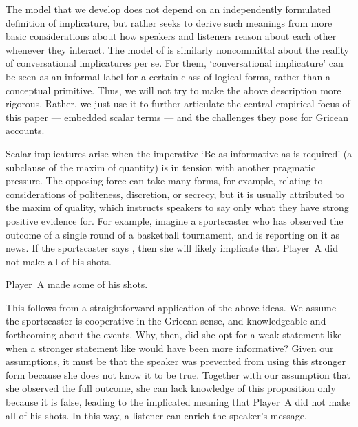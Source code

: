 \documentclass[leqno]{article}
\begin{document}
The model that we develop does not depend on an independently
formulated definition of implicature, but rather seeks to derive such
meanings from more basic considerations about how speakers and
listeners reason about each other whenever they interact. The model of
\citet{ChierchiaFoxSpector08} is similarly noncommittal about the
reality of conversational implicatures per se. For them,
`conversational implicature' can be seen as an informal label for a
certain class of logical forms, rather than a conceptual
primitive. Thus, we will not try to make the above description more
rigorous. Rather, we just use it to further articulate the central
empirical focus of this paper --- embedded scalar terms --- and the
challenges they pose for Gricean accounts.

Scalar implicatures arise when the imperative `Be as informative as is
required' (a subclause of the maxim of quantity) is in tension with
another pragmatic pressure. The opposing force can take many forms,
for example, relating to considerations of politeness, discretion, or
secrecy, but it is usually attributed to the maxim of quality, which
instructs speakers to say only what they have strong positive evidence
for. For example, imagine a sportscaster who has observed the outcome
of a single round of a basketball tournament, and is reporting on it as news. If the
sportscaster says , then she will likely implicate that
Player~A did not make all of his shots.
%
\begin{examples}
\item\label{some} Player~A made some of his shots.
\end{examples}

This follows from a straightforward application of the above ideas. We
assume the sportscaster is cooperative in the Gricean sense, and
knowledgeable and forthcoming about the events. Why, then, did she opt
for a weak statement like  when
a stronger statement like  would
have been more informative? Given our assumptions, it must be that the
speaker was prevented from using this stronger form because she does
not know it to be true. Together with our assumption that she observed
the full outcome, she can lack knowledge of this proposition only
because it is false, leading to the implicated meaning that Player~A
did not make all of his shots. In this way, a listener can enrich the
speaker's message.
\end{document}
